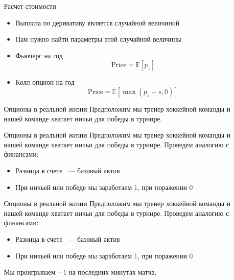 \documentclass{beamer}
\newcommand{\E}{\ensuremath{\mathbb{E}}}
\begin{document}
        \begin{frame}{Расчет стоимости}
            \begin{itemize}
                \item Выплата по деривативу является случайной величиной
                \item Нам нужно найти параметры этой случайной величины
            \end{itemize}
            \begin{itemize}
                \item Фьючерс на год
                \[
                    \mathrm{Price} = \E \left[ p_1 \right]
                \]
                \item Колл опцион на год
                \[
                    \mathrm{Price} = \E \left[ \max{(p_1 - s, 0)} \right]
                \]
            \end{itemize}
        \end{frame}

        \begin{frame}{Опционы в реальной жизни}
            Предположим мы тренер хоккейной команды и нашей команде хватает ничьи для победы в турнире.
        \end{frame}

        \begin{frame}{Опционы в реальной жизни}
            Предположим мы тренер хоккейной команды и нашей команде хватает ничьи для победы в турнире.
            Проведем аналогию с финансами:
            \begin{itemize}
                \item Разница в счете ~--- базовый актив
                \item При ничьей или победе мы заработаем 1, при поражении 0
            \end{itemize}
        \end{frame}

        \begin{frame}{Опционы в реальной жизни}
            Предположим мы тренер хоккейной команды и нашей команде хватает ничьи для победы в турнире.
            Проведем аналогию с финансами:
            \begin{itemize}
                \item Разница в счете ~--- базовый актив
                \item При ничьей или победе мы заработаем 1, при поражении 0
            \end{itemize}
            Мы проигрываем $-1$ на последних минутах матча.
        \end{frame}

    
\end{document}
